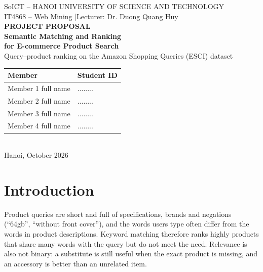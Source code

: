 \documentclass[11pt,a4paper]{article}
\begin{document}
\begin{center}
  {\small SoICT -- HANOI UNIVERSITY OF SCIENCE AND TECHNOLOGY}\\[2pt]
  {\small IT4868 -- Web Mining \quad|\quad Lecturer: Dr. Duong Quang Huy}\\[10pt]
  {\large\bfseries PROJECT PROPOSAL}\\[8pt]
  {\LARGE\bfseries Semantic Matching and Ranking}\\[2pt]
  {\LARGE\bfseries for E-commerce Product Search}\\[6pt]
  {\normalsize Query--product ranking on the Amazon Shopping Queries (ESCI) dataset}\\[10pt]
  \begin{tabular}{ll}
    \toprule
    \textbf{Member} & \textbf{Student ID} \\
    \midrule
    Member 1 full name & ........ \\
    Member 2 full name & ........ \\
    Member 3 full name & ........ \\
    Member 4 full name & ........ \\
    \bottomrule
  \end{tabular}\\[6pt]
  {\small Hanoi, October 2026}
\end{center}

\begin{abstract}
\noindent In e-commerce search, a product can be an exact match for a query (Exact), a usable replacement (Substitute), an accessory (Complement) or irrelevant. We address Task~1 of the KDD Cup 2022 ESCI Challenge: given a query and its candidate products, rank them so that Exact products come first. We use the English part of the reduced dataset. Starting from lexical, dense and cross-encoder baselines, we plan to improve the cross-encoder with a richer product representation, a stronger backbone and a training objective suited to graded labels, and to add a second-stage re-ranker that uses information from the whole candidate list. Models are compared with nDCG against Amazon's published baselines.
\end{abstract}

\section{Introduction}
Product queries are short and full of specifications, brands and negations (``64gb'', ``without front cover''), and the words users type often differ from the words in product descriptions. Keyword matching therefore ranks highly products that share many words with the query but do not meet the need. Relevance is also not binary: a substitute is still useful when the exact product is missing, and an accessory is better than an unrelated item.
\end{document}
